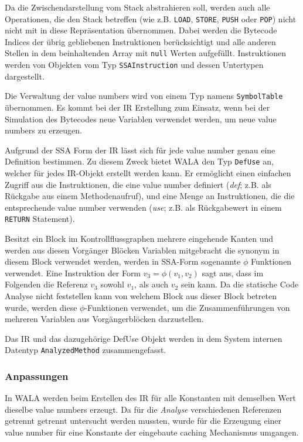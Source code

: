 Da die Zwischendarstellung vom Stack abstrahieren soll, werden auch alle Operationen, die den Stack betreffen
(wie z.B. \texttt{LOAD}, \texttt{STORE}, \texttt{PUSH} oder \texttt{POP}) nicht nicht mit in diese 
Repräsentation übernommen. Dabei werden die Bytecode Indices der übrig gebliebenen Instruktionen 
berücksichtigt und alle anderen Stellen in dem beinhaltenden Array mit \texttt{null} Werten aufgefüllt.
Instruktionen werden von Objekten vom Typ \texttt{SSAInstruction} und dessen Untertypen dargestellt.

Die Verwaltung der value numbers wird von einem Typ namens \texttt{SymbolTable} übernommen. Es kommt bei der
IR Erstellung zum Einsatz, wenn bei der Simulation des Bytecodes neue Variablen verwendet werden, um neue 
value numbers zu erzeugen.

Aufgrund der SSA Form der IR lässt sich für jede value number genau eine Definition bestimmen. Zu diesem 
Zweck bietet WALA den Typ \texttt{DefUse} an, welcher für jedes IR-Objekt erstellt werden kann. Er ermöglicht
einen einfachen Zugriff aus die Instruktionen, die eine value number definiert (\textit{def}; z.B. als 
Rückgabe aus einem Methodenaufruf), und eine Menge an Instruktionen, die die entsprechende value number 
verwenden (\textit{use}; z.B. als Rückgabewert in einem \texttt{RETURN} Statement).

Besitzt ein Block im Kontrollflussgraphen mehrere eingehende Kanten und werden aus diesen Vorgänger Blöcken
Variablen mitgebracht die synonym in diesem Block verwendet werden, werden in SSA-Form sogenannte $\phi$ 
Funktionen verwendet. Eine Instruktion der Form $v_3 = \phi(v_1, v_2)$ sagt aus, dass im Folgenden 
die Referenz $v_3$ sowohl $v_1$, als auch $v_2$ sein kann. Da die statische Code Analyse nicht feststellen
kann von welchem Block aus dieser Block betreten wurde, werden diese $\phi$-Funktionen verwendet, um
die Zusammenführungen von mehreren Variablen aus Vorgängerblöcken darzustellen.

Das IR und das dazugehörige DefUse Objekt werden in dem System internen Datentyp \texttt{AnalyzedMethod} 
zusammengefasst.

\subsubsection{Anpassungen}

In WALA werden beim Erstellen des IR für alle Konstanten mit demselben Wert dieselbe value numbers erzeugt. 
Da für die \textit{Analyse} verschiedenen Referenzen getrennt getrennt untersucht werden mussten, wurde 
für die Erzeugung einer value number für eine Konstante der eingebaute caching Mechanismus umgangen. 


